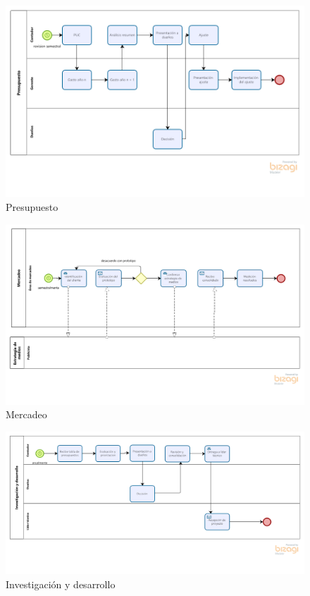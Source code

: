 \documentclass[11pt]{article}
\begin{document}
\begin{figure}[H]
\centering
\includegraphics[width=.9\linewidth]{./assets/build/presupuesto.png}
\caption{\label{fig:presupuesto}Presupuesto}
\end{figure}

\begin{figure}[H]
\centering
\includegraphics[width=.9\linewidth]{./assets/build/mercadeo.png}
\caption{\label{fig:mercadeo} Mercadeo}
\end{figure}

\begin{figure}[H]
\centering
\includegraphics[width=.9\linewidth]{./assets/build/investigacion.png}
\caption{\label{fig:investigacion} Investigación y desarrollo}
\end{figure}
\end{document}
